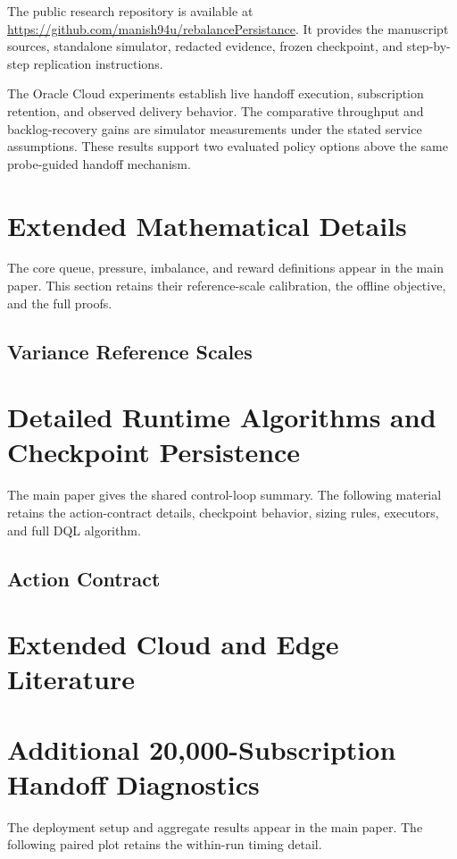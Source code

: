 
The public research repository is available at
\url{https://github.com/manish94u/rebalancePersistance}.
It provides the manuscript sources, standalone simulator, redacted evidence,
frozen checkpoint, and step-by-step replication instructions.

The Oracle Cloud experiments establish live handoff execution, subscription
retention, and observed delivery behavior. The comparative throughput and
backlog-recovery gains are simulator measurements under the stated service
assumptions. These results support two evaluated policy options above the same
probe-guided handoff mechanism.

\section{Extended Mathematical Details}
\label{app:extended-mathematics}
The core queue, pressure, imbalance, and reward definitions appear in the main
paper. This section retains their reference-scale calibration, the offline
objective, and the full proofs.
\subsection{Variance Reference Scales}

\section{Detailed Runtime Algorithms and Checkpoint Persistence}
\label{app:runtime-details}
The main paper gives the shared control-loop summary. The following material
retains the action-contract details, checkpoint behavior, sizing rules,
executors, and full DQL algorithm.
\subsection{Action Contract}

\section{Extended Cloud and Edge Literature}
\label{app:extended-literature}

\section{Additional 20,000-Subscription Handoff Diagnostics}
\label{app:cloud-timing}
The deployment setup and aggregate results appear in the main paper. The
following paired plot retains the within-run timing detail.


